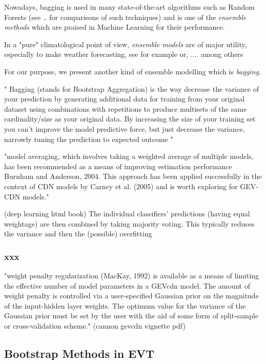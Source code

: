 Nowadays, bagging is used in 
many state-of-the-art algorithms such as Random Forests (see .. for comparisons of such techniques) and is one of the \emph{ensemble methods} which are praised in Machine Learning for their performance.  

In a "pure" climatological point of view, \emph{ensemble models} are of major utility, especially to make weather forecasting, see for example \citet{suh_development_2012} or, .... among others

For our purpose, we present another kind of ensemble modelling which is \emph{bagging}.

" Bagging (stands for Bootstrap Aggregation) is the way decrease the variance of your prediction by generating additional data for training from your original dataset using combinations with repetitions to produce multisets of the same cardinality/size as your original data. By increasing the size of your training set you can't improve the model predictive force, but just decrease the variance, narrowly tuning the prediction to expected outcome "


"model averaging, which involves taking a weighted average of
multiple models, has been recommended as a means of
improving estimation performance Burnham and Anderson, 2004. This approach has been applied successfully
in the context of CDN models by Carney et al. (2005)
and is worth exploring for GEV-CDN models."


\citet[pp.256-267]{Goodfellow-et-al-2016}  (deep learning html book)    The  individual  classifiers’  predictions  (having equal  weightage)  are  then  combined  by  taking  majority voting. This typically reduces the variance and then the (possible) overfitting



\subsubsection*{xxx}

"weight penalty regularization (MacKay, 1992) is
available as a means of limiting the effective number of model
parameters in a GEVcdn model. The amount of weight penalty is
controlled via a user-specified Gaussian prior on the magnitude of
the input-hidden layer weights. The optimum value for the
variance of the Gaussian prior must be set by the user with the
aid of some form of split-sample or cross-validation scheme." (cannon gevcdn vignette pdf)

\subsection{Bootstrap Methods in EVT}

